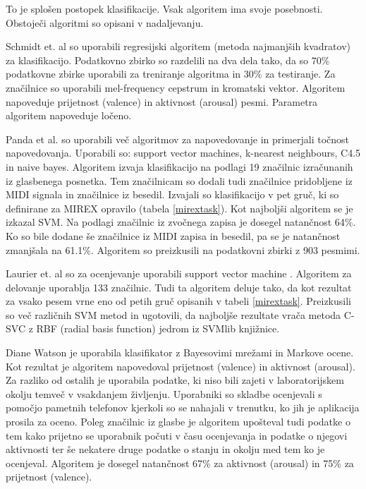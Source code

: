 \documentclass[a4paper, 12pt]{book}
\begin{document}
{To je splošen postopek klasifikacije. Vsak algoritem ima svoje posebnosti. Obstoječi algoritmi so opisani v nadaljevanju. 

Schmidt et. al \cite{schmidt2009projection} so uporabili regresijski algoritem (metoda najmanjših kvadratov) za klasifikacijo. Podatkovno zbirko so razdelili na dva dela tako, da so 70\% podatkovne zbirke uporabili za treniranje algoritma in 30\% za testiranje. Za značilnice so uporabili mel-frequency cepstrum in kromatski vektor. Algoritem napoveduje prijetnost (valence) in aktivnost (arousal) pesmi. Parametra algoritem napoveduje ločeno. 

Panda et al. \cite{panda2013multi} so uporabili več algoritmov za napovedovanje in primerjali točnost napovedovanja. Uporabili so: support vector machines, k-nearest neighbours, C4.5 in naive bayes. Algoritem izvaja klasifikacijo na podlagi 19 značilnic izračunanih iz glasbenega posnetka. Tem značilnicam so dodali tudi značilnice pridobljene iz MIDI signala in značilnice iz besedil. Izvajali so klasifikacijo v pet gruč, ki so definirane za MIREX opravilo (tabela \ref{mirextask}).  Kot najboljši algoritem se je izkazal SVM. Na podlagi značilnic iz zvočnega zapisa je dosegel natančnost 64\%. Ko so bile dodane še značilnice iz MIDI zapisa in besedil, pa se je natančnost zmanjšala na 61.1\%. Algoritem so preizkusili na podatkovni zbirki z 903 pesmimi. 

Laurier et. al \cite{laurier2007audio} so za ocenjevanje uporabili support vector machine \cite{ben2010user}. Algoritem za delovanje uporablja 133 značilnic. Tudi ta algoritem deluje tako, da kot rezultat za vsako pesem vrne eno od petih gruč opisanih v tabeli \ref{mirextask}. Preizkusili so več različnih SVM metod in ugotovili, da najboljše rezultate vrača metoda C-SVC z RBF (radial basis function) jedrom iz SVMlib knjižnice. 

Diane Watson \cite{watson2012modeling} je uporabila klasifikator z Bayesovimi mrežami in Markove ocene. Kot rezultat je algoritem napovedoval prijetnost (valence) in aktivnost (arousal). Za razliko od ostalih je uporabila podatke, ki niso bili zajeti v laboratorijskem okolju temveč v vsakdanjem življenju. Uporabniki so skladbe ocenjevali s pomočjo pametnih telefonov kjerkoli so se nahajali v trenutku, ko jih je aplikacija prosila za oceno. Poleg značilnic iz glasbe je algoritem upošteval tudi podatke o tem kako prijetno se uporabnik počuti v času ocenjevanja in podatke o njegovi aktivnosti ter še nekatere druge podatke o stanju in okolju med tem ko je ocenjeval. Algoritem je dosegel natančnost 67\% za aktivnost (arousal) in 75\% za prijetnost (valence). 

}
\end{document}
